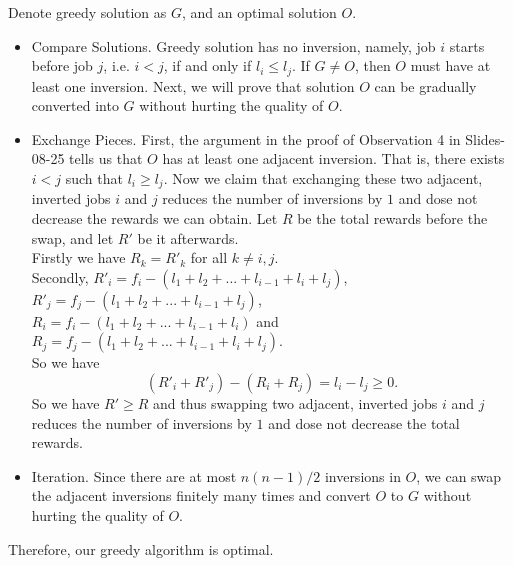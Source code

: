 \documentclass{article}
\begin{document}
Denote greedy solution as $G$, and an optimal solution $O$. 
\begin{itemize}
\item Compare Solutions. Greedy solution has no inversion, namely, job $i$ starts before job $j$, i.e. $i < j$, if and only if $l_i \leq l_j$. If $G \neq O$, then $O$ must have at least one inversion. Next, we will prove that solution $O$ can be gradually converted into $G$ without hurting the quality of $O$.

\item Exchange Pieces. First, the argument in the proof of Observation 4 in Slides-08-25 tells us that $O$ has at least one adjacent inversion. That is, there exists $i < j$ such that $l_i \geq l_j$. Now we claim that exchanging these two adjacent, inverted jobs $i$ and $j$ reduces the number of inversions by $1$ and dose not decrease the rewards we can obtain. Let $R$ be the total rewards before the swap, and let $R'$ be it afterwards. \\
Firstly we have $R_k = R'_k$ for all $k \neq i, j$. \\
Secondly, $R'_i = f_i - (l_1 + l_2 + ... + l_{i-1} + l_i + l_j)$, $R'_j= f_j - (l_1 + l_2 + ... + l_{i-1} + l_j)$, \\$R_i = f_i - (l_1 + l_2 + ... + l_{i-1} + l_i)$  and $R_j = f_j - (l_1 + l_2 + ... + l_{i-1} + l_i + l_j)$.\\ So we have $$(R'_i + R'_j) - (R_i + R_j) = l_i - l_j \geq 0.$$
So we have $R' \geq R$ and thus swapping two adjacent, inverted jobs $i$ and $j$ reduces the number of inversions by $1$ and dose not decrease the total rewards.  

\item Iteration. Since there are at most $n(n-1)/2$ inversions in $O$, we can swap the adjacent inversions finitely many times and convert $O$ to $G$ without hurting the quality of $O$. 
\end{itemize}
Therefore, our greedy algorithm is optimal.
\end{document}
